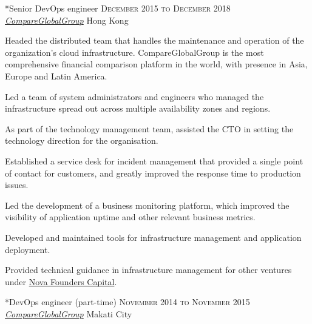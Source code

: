 \documentclass[10pt, a4paper, final]{article}
\begin{document}
\begin{section}
\begin{subsection}
\begin{compactitem}
    \end{compactitem}
  \end{subsection}
  \vspace{2em}

  \begin{subsection}*{Senior DevOps engineer \hfill\textsc{December 2015 to December 2018}}
    \href{http://www.compareglobalgroup.com}{\textit{CompareGlobalGroup}} \hfill Hong Kong
    \vspace{1em}

    Headed the distributed team that handles the maintenance and operation of the organization's cloud infrastructure. CompareGlobalGroup is the most comprehensive financial comparison platform in the world, with presence in Asia, Europe and Latin America.
    \vspace{1em}
    \begin{compactitem}
      \item Led a team of system administrators and engineers who managed the infrastructure spread out across multiple availability zones and regions.
      \item As part of the technology management team, assisted the CTO in setting the technology direction for the organisation.
      \item Established a service desk for incident management that provided a single point of contact for customers, and greatly improved the response time to production issues.
      \item Led the development of a business monitoring platform, which improved the visibility of application uptime and other relevant business metrics.
      \item Developed and maintained tools for infrastructure management and application deployment.
      \item Provided technical guidance in infrastructure management for other ventures under \href{http://www.novafounders.com/}{Nova Founders Capital}.
      
    \end{compactitem}
  \end{subsection}
  \vspace{2em}

  \begin{subsection}*{DevOps engineer (part-time) \hfill\textsc{November 2014 to November 2015}}
    \href{http://www.compareglobalgroup.com}{\textit{CompareGlobalGroup}} \hfill Makati City
    \vspace{1em}


\end{subsection}
\end{section}
\end{document}
